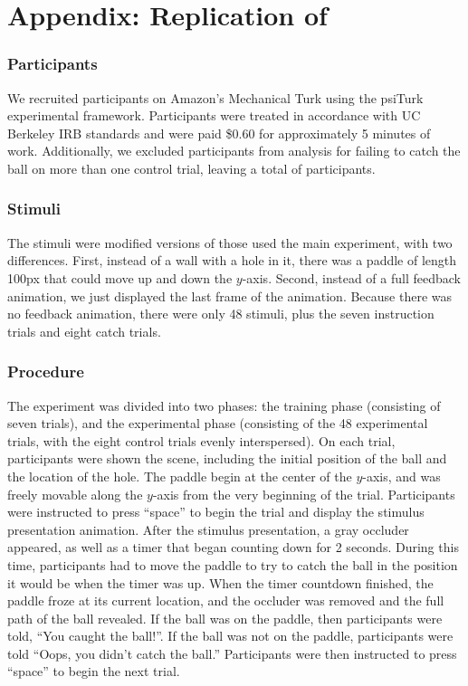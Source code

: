 \documentclass[10pt,letterpaper]{article}
\begin{document}
\section{Appendix: Replication of }

\subsubsection{Participants}

We recruited \PaddleNumComplete{} participants on Amazon's Mechanical Turk using the psiTurk \cite{McDonnell12} experimental framework.
Participants were treated in accordance with UC Berkeley IRB standards and were paid \$0.60 for approximately 5 minutes of work.
Additionally, we excluded \PaddleNumFailed{} participants from analysis for failing to catch the ball on more than one control trial, leaving a total of \PaddleNumOk{} participants.

\subsubsection{Stimuli}

The stimuli were modified versions of those used the main experiment, with two differences.
First, instead of a wall with a hole in it, there was a paddle of length 100px that could move up and down the $y$-axis.
Second, instead of a full feedback animation, we just displayed the last frame of the animation.
Because there was no feedback animation, there were only 48 stimuli, plus the seven instruction trials and eight catch trials.

\subsubsection{Procedure}

The experiment was divided into two phases: the training phase (consisting of seven trials), and the experimental phase (consisting of the 48 experimental trials, with the eight control trials evenly interspersed).
On each trial, participants were shown the scene, including the initial position of the ball and the location of the hole.
The paddle begin at the center of the $y$-axis, and was freely movable along the $y$-axis from the very beginning of the trial.
Participants were instructed to press ``space'' to begin the trial and display the stimulus presentation animation.
After the stimulus presentation, a gray occluder appeared, as well as a timer that began counting down for 2 seconds.
During this time, participants had to move the paddle to try to catch the ball in the position it would be when the timer was up.
When the timer countdown finished, the paddle froze at its current location, and the occluder was removed and the full path of the ball revealed.
If the ball was on the paddle, then participants were told, ``You caught the ball!''.
If the ball was not on the paddle, participants were told ``Oops, you didn't catch the ball.''
Participants were then instructed to press ``space'' to begin the next trial.
\end{document}
